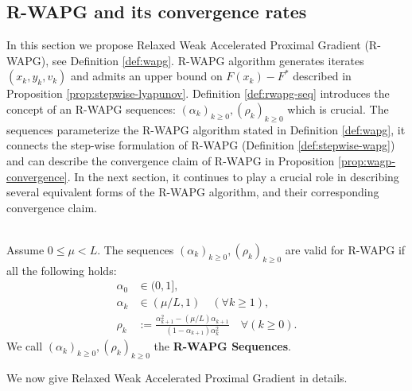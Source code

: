 \documentclass[12pt]{article}
\begin{document}
    \subsection{R-WAPG and its convergence rates}\label{sec:rwapg-formulation-convergence}
        In this section we propose Relaxed Weak Accelerated Proximal Gradient (R-WAPG), see Definition \ref{def:wapg}.
        R-WAPG algorithm generates iterates $(x_k, y_k, v_k)$ and admits an upper bound on $F(x_k) - F^*$ described in Proposition \ref{prop:stepwise-lyapunov}. 
        Definition \ref{def:rwapg-seq} introduces the concept of an R-WAPG sequences: $(\alpha_k)_{k \ge 0}, (\rho_k)_{k \ge 0}$ which is crucial.
        The sequences parameterize the R-WAPG algorithm stated in Definition \ref{def:wapg}, it connects the step-wise formulation of R-WAPG (Definition \ref{def:stepwise-wapg}) and can describe the convergence claim of R-WAPG in Proposition \ref{prop:wagp-convergence}. 
        In the next section, it continues to play a crucial role in describing several equivalent forms of the R-WAPG algorithm, and their corresponding convergence claim. 
        \begin{definition}\label{def:rwapg-seq}\;\\
            Assume $0 \le \mu < L$. 
            The sequences $(\alpha_k)_{k \ge 0}, (\rho_k)_{k \ge 0}$ are valid for R-WAPG if all the following holds: 
            \begin{align*}
                \alpha_0 &\in (0, 1], 
                \\
                \alpha_k &\in (\mu/L, 1) \quad (\forall k \ge 1), 
                \\
                \rho_k &:= \frac{\alpha_{k + 1}^2 - (\mu/L)\alpha_{k + 1}}{(1 - \alpha_{k + 1})\alpha_k^2} \quad \forall (k \ge 0). 
            \end{align*}
            We call $(\alpha_k)_{k \ge 0}, (\rho_k)_{k \ge 0}$ the \textbf{R-WAPG Sequences}. 
        \end{definition}
        We now give Relaxed Weak Accelerated Proximal Gradient in details.
\end{document}
